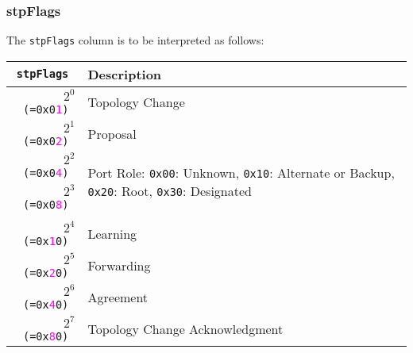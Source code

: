 \documentclass[documentation]{subfiles}
\begin{document}
\subsubsection{stpFlags}\label{stpFlags}
The {\tt stpFlags} column is to be interpreted as follows:
\begin{longtable}{>{\tt}rl}
    \toprule
    {\bf stpFlags} & {\bf Description}\\
    \midrule\endhead%
    $2^0$ (=0x0\textcolor{magenta}{1}) & Topology Change\\
    $2^1$ (=0x0\textcolor{magenta}{2}) & Proposal\\
    $2^2$ (=0x0\textcolor{magenta}{4}) & \multirow{2}{*}{Port Role: {\tt 0x00}: Unknown, {\tt 0x10}: Alternate or Backup, {\tt 0x20}: Root, {\tt 0x30}: Designated}\\
    $2^3$ (=0x0\textcolor{magenta}{8}) & \\
    \\
    $2^4$ (=0x\textcolor{magenta}{1}0) & Learning\\
    $2^5$ (=0x\textcolor{magenta}{2}0) & Forwarding\\
    $2^6$ (=0x\textcolor{magenta}{4}0) & Agreement\\
    $2^7$ (=0x\textcolor{magenta}{8}0) & Topology Change Acknowledgment\\
    \bottomrule
\end{longtable}
\end{document}
